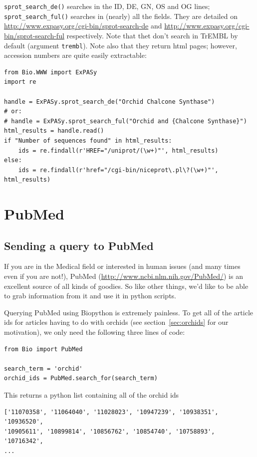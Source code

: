 \documentclass{report}
\begin{document}
\verb|sprot_search_de()| searches in the ID, DE, GN, OS and OG lines;
\verb|sprot_search_ful()| searches in (nearly) all the fields. They
are detailed on
\url{http://www.expasy.org/cgi-bin/sprot-search-de} and
\url{http://www.expasy.org/cgi-bin/sprot-search-ful}
respectively. Note that thet don't search in TrEMBL by default
(argument \verb|trembl|). Note also that they return html pages;
however, accession numbers are quite easily extractable:

\begin{verbatim}
from Bio.WWW import ExPASy
import re

handle = ExPASy.sprot_search_de("Orchid Chalcone Synthase")
# or:
# handle = ExPASy.sprot_search_ful("Orchid and {Chalcone Synthase}")
html_results = handle.read()
if "Number of sequences found" in html_results:
    ids = re.findall(r'HREF="/uniprot/(\w+)"', html_results)
else:
    ids = re.findall(r'href="/cgi-bin/niceprot\.pl\?(\w+)"', html_results)
\end{verbatim}

\section{PubMed}
\label{sec:pub_med}

\subsection{Sending a query to PubMed}

If you are in the Medical field or interested in human issues (and many times even if you are not!), PubMed (\url{http://www.ncbi.nlm.nih.gov/PubMed/}) is an excellent source of all kinds of goodies. So like other things, we'd like to be able to grab information from it and use it in python scripts.


Querying PubMed using Biopython is extremely painless. To get all of the article ids for articles having to do with orchids (see section~\ref{sec:orchids} for our motivation), we only need the following three lines of code:

\begin{verbatim}
from Bio import PubMed

search_term = 'orchid'
orchid_ids = PubMed.search_for(search_term)
\end{verbatim}

This returns a python list containing all of the orchid ids

\begin{verbatim}
['11070358', '11064040', '11028023', '10947239', '10938351', '10936520', 
'10905611', '10899814', '10856762', '10854740', '10758893', '10716342', 
...
\end{verbatim}
\end{document}
